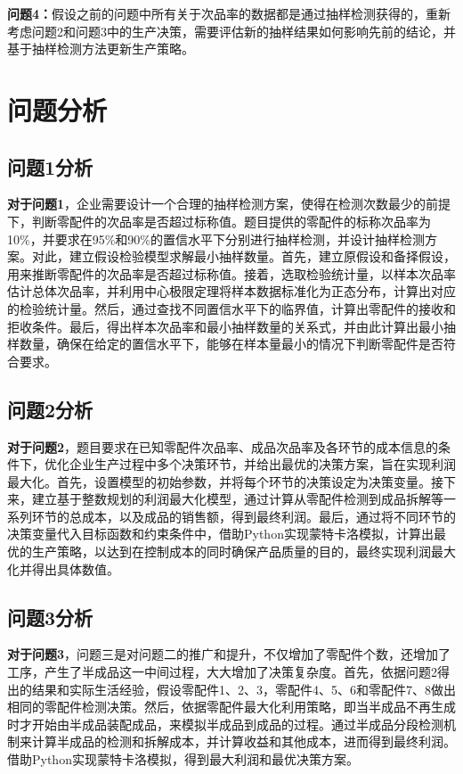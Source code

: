 \documentclass[withoutpreface,bwprint]{cumcmthesis} %
\begin{document}
\textbf{问题4：}假设之前的问题中所有关于次品率的数据都是通过抽样检测获得的，重新考虑问题2和问题3中的生产决策，需要评估新的抽样结果如何影响先前的结论，并基于抽样检测方法更新生产策略。

\section{问题分析}

\subsection{问题1分析}

\textbf{对于问题1}，企业需要设计一个合理的抽样检测方案，使得在检测次数最少的前提下，判断零配件的次品率是否超过标称值。题目提供的零配件的标称次品率为10\%，并要求在95\%和90\%的置信水平下分别进行抽样检测，并设计抽样检测方案。对此，建立假设检验模型求解最小抽样数量。首先，建立原假设和备择假设，用来推断零配件的次品率是否超过标称值。接着，选取检验统计量，以样本次品率估计总体次品率，并利用中心极限定理将样本数据标准化为正态分布，计算出对应的检验统计量。然后，通过查找不同置信水平下的临界值，计算出零配件的接收和拒收条件。最后，得出样本次品率和最小抽样数量的关系式，并由此计算出最小抽样数量，确保在给定的置信水平下，能够在样本量最小的情况下判断零配件是否符合要求。

\subsection{问题2分析}

\textbf{对于问题2}，题目要求在已知零配件次品率、成品次品率及各环节的成本信息的条件下，优化企业生产过程中多个决策环节，并给出最优的决策方案，旨在实现利润最大化。首先，设置模型的初始参数，并将每个环节的决策设定为决策变量。接下来，建立基于整数规划的利润最大化模型，通过计算从零配件检测到成品拆解等一系列环节的总成本，以及成品的销售额，得到最终利润。最后，通过将不同环节的决策变量代入目标函数和约束条件中，借助Python实现蒙特卡洛模拟，计算出最优的生产策略，以达到在控制成本的同时确保产品质量的目的，最终实现利润最大化并得出具体数值。

\subsection{问题3分析}

\textbf{对于问题3}，问题三是对问题二的推广和提升，不仅增加了零配件个数，还增加了工序，产生了半成品这一中间过程，大大增加了决策复杂度。首先，依据问题2得出的结果和实际生活经验，假设零配件1、2、3，零配件4、5、6和零配件7、8做出相同的零配件检测决策。然后，依据零配件最大化利用策略，即当半成品不再生成时才开始由半成品装配成品，来模拟半成品到成品的过程。通过半成品分段检测机制来计算半成品的检测和拆解成本，并计算收益和其他成本，进而得到最终利润。借助Python实现蒙特卡洛模拟，得到最大利润和最优决策方案。
\end{document}
